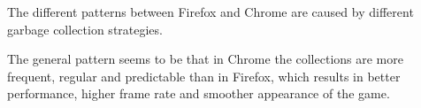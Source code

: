The different patterns between Firefox and Chrome are caused by different garbage collection strategies\cite{mdn_mm, browser_gc}.

The general pattern seems to be that in Chrome the collections are more frequent, regular and predictable than in Firefox, which results in better performance, higher frame rate and smoother appearance of the game. 

%


